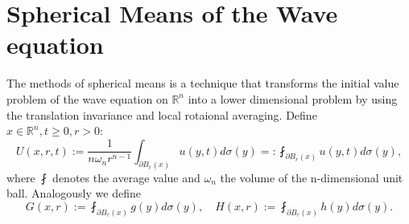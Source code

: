 \documentclass[A4,12pt,twoside]{book}
\begin{document}
\section{Spherical Means of the Wave equation}
The methods of spherical means is a technique that transforms the initial value problem of the wave equation on $\mathbb{R}^n$ into a lower dimensional problem by using the translation invariance and local rotaional averaging. Define $x \in \mathbb{R}^n, t \geq 0, r>0$: 
\[
U(x,r,t) := \frac{1}{n \omega_n r^{n-1}} \int_{\partial B_r (x)} u(y,t) d \sigma (y) =: \fint_{\partial B_r (x)} u(y,t) d \sigma (y),
\]
where $\fint$ denotes the average value and $\omega_n$ the volume of the n-dimensional unit ball. Analogously we define 
\[
G(x,r) := \fint_{\partial B_r (x)} g(y) d\sigma (y), \quad H(x,r) := \fint_{\partial B_r (x)} h(y) d\sigma (y).
\]
\end{document}
